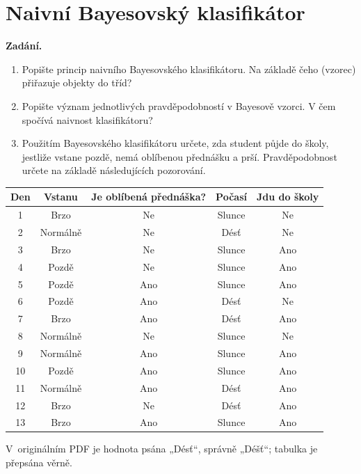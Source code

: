 \section{Naivní Bayesovský klasifikátor}

\noindent\textbf{Zadání.}\par
\begin{enumerate}
  \item Popište princip naivního Bayesovského klasifikátoru. Na základě čeho (vzorec) přiřazuje
    objekty do tříd?
  \item Popište význam jednotlivých pravděpodobností v Bayesově vzorci. V čem spočívá naivnost
    klasifikátoru?
  \item Použitím Bayesovského klasifikátoru určete, zda student půjde do školy, jestliže vstane
    pozdě, nemá oblíbenou přednášku a prší. Pravděpodobnost určete na základě následujících pozorování.
\end{enumerate}

\begin{center}
\begin{tabular}{ccccc}
\toprule
Den & Vstanu & Je oblíbená přednáška? & Počasí & Jdu do školy \\
\midrule
1  & Brzo     & Ne  & Slunce & Ne  \\
2  & Normálně & Ne  & Désť   & Ne  \\
3  & Brzo     & Ne  & Slunce & Ano \\
4  & Pozdě    & Ne  & Slunce & Ano \\
5  & Pozdě    & Ano & Slunce & Ano \\
6  & Pozdě    & Ano & Désť   & Ne  \\
7  & Brzo     & Ano & Désť   & Ano \\
8  & Normálně & Ne  & Slunce & Ne  \\
9  & Normálně & Ano & Slunce & Ano \\
10 & Pozdě    & Ano & Slunce & Ano \\
11 & Normálně & Ano & Désť   & Ano \\
12 & Brzo     & Ne  & Désť   & Ano \\
13 & Brzo     & Ano & Slunce & Ano \\
\bottomrule
\end{tabular}
\end{center}
{\footnotesize\noindent V~originálním PDF je hodnota psána „Désť``, správně „Déšť``; tabulka je přepsána věrně.\par}


